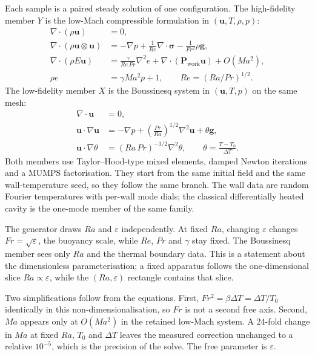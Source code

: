 \documentclass[preprint,11pt,a4paper,times,doubleblind]{elsarticle}
\begin{document}
Each sample is a paired steady solution of one configuration. The high-fidelity member $Y$ is
the low-Mach compressible formulation in $(\bm u,T,\rho,p)$:
\begin{align}
  \nabla\cdot(\rho\bm u)&=0,\label{eq:mass}\\
  \nabla\cdot(\rho\bm u\otimes\bm u)&=-\nabla p+\frac{1}{Re}\nabla\cdot\bm\sigma
  -\frac{1}{Fr^2}\rho\bm g,\label{eq:mom}\\
  \nabla\cdot(\rho E\bm u)&=\frac{\gamma}{Re\,Pr}\nabla^2 e
  +\nabla\cdot(\bm P_{\mathrm{work}}\bm u)+O(Ma^2),\label{eq:energy}\\
  \rho e&=\gamma Ma^2p+1,\qquad Re=(Ra/Pr)^{1/2}.\label{eq:eos}
\end{align}
The low-fidelity member $X$ is the Boussinesq system in $(\bm u,T,p)$ on the same mesh:
\begin{align}
  \nabla\cdot\bm u&=0,\label{eq:bqmass}\\
  \bm u\cdot\nabla\bm u&=-\nabla p+\left(\frac{Pr}{Ra}\right)^{1/2}\nabla^2\bm u
  +\theta\bm g,\label{eq:bqmom}\\
  \bm u\cdot\nabla\theta&=(Ra\,Pr)^{-1/2}\nabla^2\theta,\qquad
  \theta=\frac{T-T_0}{\Delta T}.\label{eq:bqtemp}
\end{align}
Both members use Taylor--Hood-type mixed elements, damped Newton iterations and a MUMPS
factorisation. They start from the same initial field and the same wall-temperature seed, so
they follow the same branch. The wall data are random Fourier temperatures with per-wall mode
dials; the classical differentially heated cavity is the one-mode member of the same family.

The generator draws $Ra$ and $\varepsilon$ independently. At fixed $Ra$, changing
$\varepsilon$ changes $Fr=\sqrt{\varepsilon}$, the buoyancy scale, while $Re$, $Pr$ and
$\gamma$ stay fixed. The Boussinesq member sees only $Ra$ and the thermal boundary data. This
is a statement about the dimensionless parameterisation; a fixed apparatus follows the
one-dimensional slice $Ra\propto\varepsilon$, while the $(Ra,\varepsilon)$ rectangle contains
that slice.

Two simplifications follow from the equations. First, $Fr^2=\beta\Delta T=\Delta T/T_0$
identically in this non-dimensionalisation, so $Fr$ is not a second free axis. Second, $Ma$
appears only at $O(Ma^2)$ in the retained low-Mach system. A 24-fold change in $Ma$ at fixed
$Ra$, $T_0$ and $\Delta T$ leaves the measured correction unchanged to a relative $10^{-5}$,
which is the precision of the solve. The free parameter is $\varepsilon$.
\end{document}
